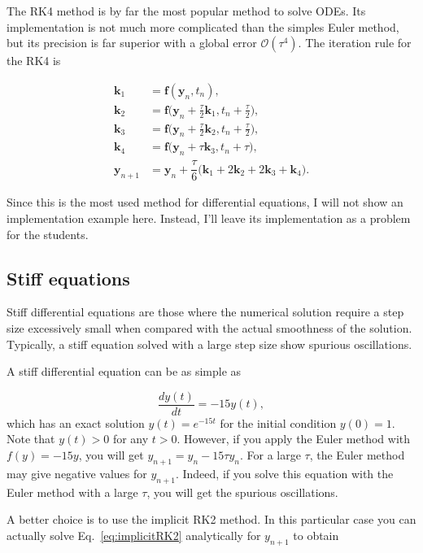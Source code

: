 The RK4 method is by far the most popular method to solve ODEs. Its implementation is not much more complicated than the simples Euler method, but its precision is far superior with a global error $\mathcal{O}(\tau^4)$. The iteration rule for the RK4 is

\begin{align}
 \bm{k}_1 &= \bm{f}(\bm{y}_n, t_n),\\
 \bm{k}_2 &= \bm{f}\Big(\bm{y}_n + \frac{\tau}{2}\bm{k}_1, t_n + \frac{\tau}{2}\Big),\\
 \bm{k}_3 &= \bm{f}\Big(\bm{y}_n + \frac{\tau}{2}\bm{k}_2, t_n + \frac{\tau}{2}\Big),\\
 \bm{k}_4 &= \bm{f}\Big(\bm{y}_n + \tau \bm{k}_3, t_n + \tau\Big),\\
 \bm{y}_{n+1} &= \bm{y}_n + \dfrac{\tau}{6}\Big(\bm{k}_1 + 2\bm{k}_2 + 2\bm{k}_3 + \bm{k}_4\Big).
\end{align}

Since this is the most used method for differential equations, I will not show an implementation example here. Instead, I'll leave its implementation as a problem for the students.

\subsection{Stiff equations}

Stiff differential equations are those where the numerical solution require a step size excessively small when compared with the actual smoothness of the solution. Typically, a stiff equation solved with a large step size show spurious oscillations. 

A stiff differential equation can be as simple as

\begin{equation}
 \dfrac{d y(t)}{dt} = -15 y(t),
\end{equation}
which has an exact solution $y(t) = e^{-15 t}$ for the initial condition $y(0) = 1$. Note that $y(t) > 0$ for any $t > 0$. However, if you apply the Euler method with $f(y) = -15y$, you will get $y_{n+1} = y_n -15\tau y_n$. For a large $\tau$, the Euler method may give negative values for $y_{n+1}$. Indeed, if you solve this equation with the Euler method with a large $\tau$, you will get the spurious oscillations.

A better choice is to use the implicit RK2 method. In this particular case you can actually solve Eq.~\eqref{eq:implicitRK2} analytically for $y_{n+1}$ to obtain

